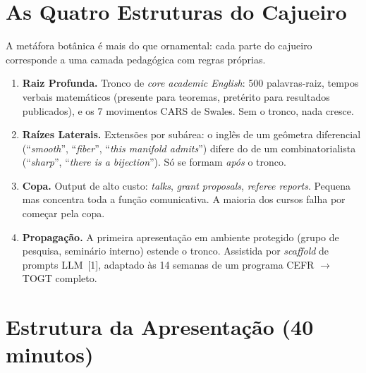 \documentclass[11pt,a4paper]{article}
\begin{document}
\section*{As Quatro Estruturas do Cajueiro}

A metáfora botânica é mais do que ornamental: cada parte do cajueiro corresponde a uma camada pedagógica com regras próprias.

\begin{enumerate}[leftmargin=2em,itemsep=0.15em]
  \item \textbf{Raiz Profunda.} Tronco de \emph{core academic English}: 500 palavras-raiz, tempos verbais matemáticos (presente para teoremas, pretérito para resultados publicados), e os 7 movimentos CARS de Swales. Sem o tronco, nada cresce.
  \item \textbf{Raízes Laterais.} Extensões por subárea: o inglês de um geômetra diferencial (``\emph{smooth}'', ``\emph{fiber}'', ``\emph{this manifold admits}'') difere do de um combinatorialista (``\emph{sharp}'', ``\emph{there is a bijection}''). Só se formam \emph{após} o tronco.
  \item \textbf{Copa.} Output de alto custo: \emph{talks}, \emph{grant proposals}, \emph{referee reports}. Pequena mas concentra toda a função comunicativa. A maioria dos cursos falha por começar pela copa.
  \item \textbf{Propagação.} A primeira apresentação em ambiente protegido (grupo de pesquisa, seminário interno) estende o tronco. Assistida por \emph{scaffold} de prompts LLM~[1], adaptado às 14 semanas de um programa CEFR $\to$ TOGT completo.
\end{enumerate}

\section*{Estrutura da Apresentação (40 minutos)}
\end{document}
